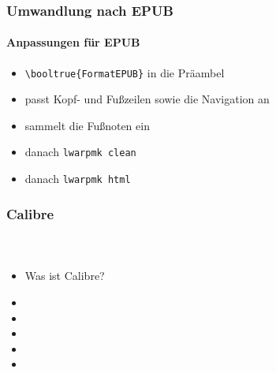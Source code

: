 \documentclass[12pt,ngerman]{beamer}
\begin{document}
\begin{frame}[fragile]
\frametitle{Umwandlung nach EPUB}
\framesubtitle{Anpassungen für EPUB}

\begin{itemize}
\item \verb|\booltrue{FormatEPUB}| in die Präambel
\item passt Kopf- und Fußzeilen sowie die Navigation an
\item sammelt die Fußnoten ein
\item danach \texttt{lwarpmk clean}
\item danach \texttt{lwarpmk html}
\end{itemize}
\end{frame}


\begin{frame}
\frametitle{Calibre}
\framesubtitle{~}

\begin{itemize}
\item Was ist Calibre?
\item 
\item 
\item 
\item 
\item 
\end{itemize}
\end{frame}
\end{document}
